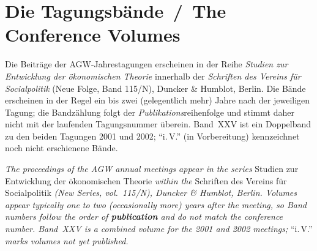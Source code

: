 \documentclass[11pt,a4paper,twoside]{article}
\begin{document}
\section{Die Tagungsbände \,/\, The Conference Volumes}
Die Beiträge der AGW-Jahrestagungen erscheinen in der Reihe \textit{Studien zur Entwicklung der ökonomischen Theorie} innerhalb der \textit{Schriften des Vereins für Socialpolitik} (Neue Folge, Band 115/\textsc{N}), Duncker \& Humblot, Berlin. Die Bände erscheinen in der Regel ein bis zwei (gelegentlich mehr) Jahre nach der jeweiligen Tagung; die Bandzählung folgt der \emph{Publikations}reihenfolge und stimmt daher nicht mit der laufenden Tagungsnummer überein. Band~XXV ist ein Doppelband zu den beiden Tagungen 2001 und 2002; ``i.\,V.'' (in Vorbereitung) kennzeichnet noch nicht erschienene Bände.
\par\smallskip\noindent\textit{The proceedings of the AGW annual meetings appear in the series} Studien zur Entwicklung der ökonomischen Theorie \textit{within the} Schriften des Vereins für Socialpolitik \textit{(New Series, vol.\ 115/\textsc{N}), Duncker \& Humblot, Berlin. Volumes appear typically one to two (occasionally more) years after the meeting, so Band numbers follow the order of \textbf{publication} and do not match the conference number. Band~XXV is a combined volume for the 2001 and 2002 meetings;} ``i.\,V.'' \textit{marks volumes not yet published.}
\end{document}
